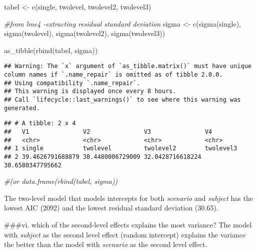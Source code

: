 \documentclass[
]{article}
\newenvironment{Shaded}{\begin{snugshade}}{\end{snugshade}}
\newcommand{\CommentTok}[1]{\textcolor[rgb]{0.56,0.35,0.01}{\textit{#1}}}
\newcommand{\FunctionTok}[1]{\textcolor[rgb]{0.00,0.00,0.00}{#1}}
\newcommand{\NormalTok}[1]{#1}
\newcommand{\OtherTok}[1]{\textcolor[rgb]{0.56,0.35,0.01}{#1}}
\newcommand{\StringTok}[1]{\textcolor[rgb]{0.31,0.60,0.02}{#1}}
\begin{document}
\begin{Shaded}
\begin{Highlighting}[]
\NormalTok{tabel }\OtherTok{\textless{}{-}} \FunctionTok{c}\NormalTok{(}\StringTok{\textquotesingle{}single\textquotesingle{}}\NormalTok{, }\StringTok{\textquotesingle{}twolevel\textquotesingle{}}\NormalTok{, }\StringTok{\textquotesingle{}twolevel2\textquotesingle{}}\NormalTok{, }\StringTok{\textquotesingle{}twolevel3\textquotesingle{}}\NormalTok{)}

\CommentTok{\#from lme4 {-}extracting residual standard deviation }
\NormalTok{sigma }\OtherTok{\textless{}{-}} \FunctionTok{c}\NormalTok{(}\FunctionTok{sigma}\NormalTok{(single), }\FunctionTok{sigma}\NormalTok{(twolevel), }\FunctionTok{sigma}\NormalTok{(twolevel2), }\FunctionTok{sigma}\NormalTok{(twolevel3))}

\FunctionTok{as\_tibble}\NormalTok{(}\FunctionTok{rbind}\NormalTok{(tabel, sigma))}
\end{Highlighting}
\end{Shaded}

\begin{verbatim}
## Warning: The `x` argument of `as_tibble.matrix()` must have unique column names if `.name_repair` is omitted as of tibble 2.0.0.
## Using compatibility `.name_repair`.
## This warning is displayed once every 8 hours.
## Call `lifecycle::last_warnings()` to see where this warning was generated.
\end{verbatim}

\begin{verbatim}
## # A tibble: 2 x 4
##   V1               V2               V3               V4              
##   <chr>            <chr>            <chr>            <chr>           
## 1 single           twolevel         twolevel2        twolevel3       
## 2 39.4626791688879 38.4480006729009 32.0428716618224 30.6580347795662
\end{verbatim}

\begin{Shaded}
\begin{Highlighting}[]
\CommentTok{\#(or data.frame(rbind(tabel, sigma))}
\end{Highlighting}
\end{Shaded}

The two-level model that models intercepts for both \emph{scenario} and
\emph{subject} has the lowest AIC (2092) and the lowest residual
standard deviation (30.65).

\#\#\#vi. which of the second-level effects explains the most variance?
The model with \emph{subject} as the second level effect (random
intercept) explains the variance the better than the model with
\emph{scenario} as the second level effect.
\end{document}
